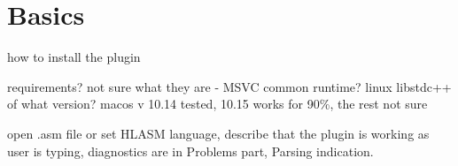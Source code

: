 \chapter{Basics}

how to install the plugin

requirements? not sure what they are - MSVC common runtime? linux libstdc++ of what version? macos v 10.14 tested, 10.15 works for 90\%, the rest not sure

open .asm file or set HLASM language, describe that the plugin is working as user is typing, diagnostics are in Problems part, Parsing indication.

